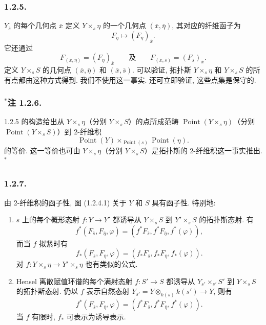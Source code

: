 \subsubsection*{1.2.5.}
$Y_{\bar s}$ 的每个几何点 $\bar x$ 定义 $Y\times_s\eta$ 的一个几何点 $(\bar x,\bar\eta)$, 其对应的纤维函子为
\begin{equation*}
F_\eta\longmapsto(F_{\bar\eta})_{\bar x}.
\end{equation*}
它还通过
\begin{equation*}
F_{(\bar x,\bar\eta)}=(F_{\bar\eta})_{\bar x}
\qquad\text{及}\qquad
F_{(\bar x,\bar s)}=(F_{\bar s})_{\bar x}.
\end{equation*}
定义 $Y\times_sS$ 的几何点 $(\bar x,\bar\eta)$ 和 $(\bar x,\bar s)$. 可以验证, 拓扑斯 $Y\times_s\eta$ 和 $Y\times_sS$ 的所有点都由这种方式得到. 我们不使用这一事实. 还可立即验证, 这些点集是保守的.

\subsubsection*{${}^{*}$注 1.2.6.}
1.2.5 的构造给出从 $Y\times_s\eta$（分别 $Y\times_sS$）的点所成范畴 $\operatorname{Point}(Y\times_s\eta)$（分别 $\operatorname{Point}(Y\times_sS)$）到 2-纤维积
\begin{equation*}
\operatorname{Point}(Y)\times_{\operatorname{Point}(s)}
\operatorname{Point}(\eta).
\end{equation*}
的等价. 这一等价也可由 $Y\times_s\eta$（分别 $Y\times_sS$）是拓扑斯的 2-纤维积这一事实推出.${}^{*}$

\subsubsection*{1.2.7.}
由 2-纤维积的函子性, 图 (1.2.4.1) 关于 $Y$ 和 $S$ 具有函子性. 特别地:
\begin{enumerate}[label=\alph*)]
\item $s$ 上的每个概形态射 $f:Y\longrightarrow Y'$ 都诱导从 $Y\times_sS$ 到 $Y'\times_sS$ 的拓扑斯态射. 有
\begin{equation}\tag{1.2.7.1}
f^*(F_{\bar s},F_{\bar\eta},\varphi)
=(f^*F_{\bar s},f^*F_{\bar\eta},f^*(\varphi)),
\end{equation}
而当 $f$ 拟紧时有
\begin{equation}\tag{1.2.7.2}
f_*(F_{\bar s},F_{\bar\eta},\varphi)
=(f_*F_{\bar s},f_*F_{\bar\eta},f_*(\varphi)).
\end{equation}
对 $f:Y\times_s\eta\longrightarrow Y'\times_s\eta$ 也有类似的公式.

\item Hensel 离散赋值环谱的每个满射态射 $f:S'\longrightarrow S$ 都诱导从 $Y_{s'}\times_{s'}S'$ 到 $Y\times_sS$ 的拓扑斯态射. 仍以 $f$ 表示自然态射 $Y_{s'}=Y\otimes_{k(s)}k(s')\longrightarrow Y$, 则有
\begin{equation}\tag{1.2.7.3}
f^*(F_{\bar s},F_{\bar\eta},\varphi)
=(f^*F_{\bar s},f^*F_{\bar\eta},f^*(\varphi)).
\end{equation}
当 $f$ 有限时, $f_*$ 可表示为诱导表示.
\end{enumerate}

